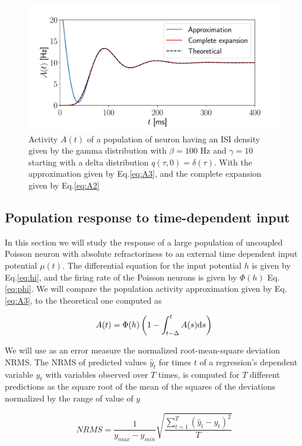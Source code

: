 \documentclass[12pt,twoside]{report}
\def \dd  {{\rm d}}
\begin{document}
\begin{figure}[h!]
	\centering
	\includegraphics[width=0.8\linewidth]{delta_gamma.pdf}
	\caption{Activity $A(t)$ of a population of neuron having an ISI density given by the gamma distribution with $\beta=100$ Hz and $\gamma=10$ starting with a delta distribution $q(\tau,0)=\delta(\tau)$. With the approximation given by Eq.\eqref{eq:A3}, and the complete expansion given by Eq.\ref{eq:A2}}
	\label{fig:delta_gamma}
\end{figure}




\subsection{Population response to time-dependent input}
In this section we will study the response of a large population of uncoupled Poisson neuron with absolute refractoriness to an external time dependent input potential $\mu(t)$. The differential equation for the input potential $h$ is given by Eq.\eqref{eq:hi}, and the firing rate of the Poisson neurons is given by $\Phi(h)$ Eq.\eqref{eq:phi}. We will compare the population activity approximation given by Eq.\eqref{eq:A3}, to the theoretical one computed as

\begin{equation}
A(t)=\Phi(h)\left(1-\int_{t-\Delta}^t A(s)\dd s\right)
\end{equation}

We will use as an error measure the normalized root-mean-square deviation NRMS.
The NRMS of predicted values $\hat {y}_t$ for times $t$ of a regression's dependent variable $y_t$ with variables observed over $T$ times, is computed for $T$ different predictions as the square root of the mean of the squares of the deviations normalized by the range of value of $y$

\begin{equation}
NRMS=\frac{1}{y_{max}-y_{min}}\sqrt{\frac{\sum_{t=1}^T(\hat{y}_t-y_t)^2}{T}}
\end{equation}
\end{document}

